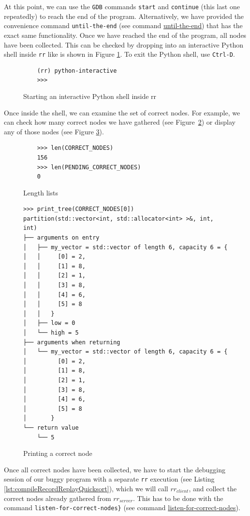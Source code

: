 At this point, we can use the \verb|GDB| commands \verb|start| and \verb|continue| (this last one repeatedly) to reach the end of the program.
Alternatively, we have provided the convenience command \verb|until-the-end| (see command \hyperref[command:until-the-end]{until-the-end}) that has the exact same functionality.
Once we have reached the end of the program, all nodes have been collected. This can be checked by dropping into an interactive Python shell inside \verb|rr| like is shown in Figure \ref{fig:python-interactive}. To exit the Python shell, use \verb|Ctrl-D|.
\begin{figure}
    \centering
    \caption{Starting an interactive Python shell inside rr}
    \label{fig:python-interactive}
    \begin{verbatim}
    (rr) python-interactive
    >>>
    \end{verbatim}
\end{figure}
Once inside the shell, we can examine the set of correct nodes. For example, we can check how many correct nodes we have gathered (see Figure~\ref{fig:lengthLists}) or display any of those nodes (see Figure \ref{fig:printCorrectNode}).
\begin{figure}
    \centering
    \caption{Length lists}
    \label{fig:lengthLists}
    \begin{verbatim}
    >>> len(CORRECT_NODES)
    156
    >>> len(PENDING_CORRECT_NODES)
    0
    \end{verbatim}
\end{figure}

\begin{figure}
    \centering
    \caption{Printing a correct node}
    \label{fig:printCorrectNode}
    \begin{verbatim}
>>> print_tree(CORRECT_NODES[0])
partition(std::vector<int, std::allocator<int> >&, int, int)
├── arguments on entry
│   ├── my_vector = std::vector of length 6, capacity 6 = {
│   │     [0] = 2,
│   │     [1] = 8,
│   │     [2] = 1,
│   │     [3] = 8,
│   │     [4] = 6,
│   │     [5] = 8
│   │   }
│   ├── low = 0
│   └── high = 5
├── arguments when returning
│   └── my_vector = std::vector of length 6, capacity 6 = {
│         [0] = 2,
│         [1] = 8,
│         [2] = 1,
│         [3] = 8,
│         [4] = 6,
│         [5] = 8
│       }
└── return value
    └── 5
    \end{verbatim}
\end{figure}
Once all correct nodes have been collected, we have to start the debugging session of our buggy program with a separate \verb|rr| execution (see Listing \ref{lst:compileRecordReplayQuicksort}), which we will call \(rr_{client}\), and collect the correct nodes already gathered from \(rr_{server}\). This has to be done with the command \verb|listen-for-correct-nodes}| (see command \hyperref[command:listen-for-correct-nodes]{listen-for-correct-nodes}).

